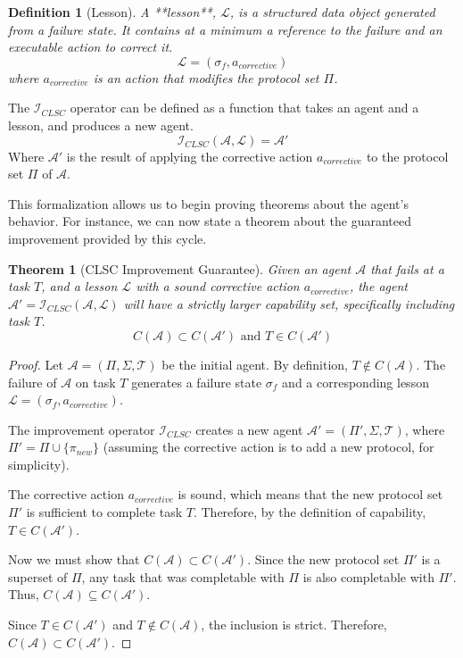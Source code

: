\documentclass{article}
\newtheorem{definition}{Definition}
\newtheorem{theorem}{Theorem}
\begin{document}
\begin{definition}[Lesson]
A **lesson**, $\mathcal{L}$, is a structured data object generated from a failure state. It contains at a minimum a reference to the failure and an executable action to correct it.
$$ \mathcal{L} = (\sigma_f, a_{corrective}) $$
where $a_{corrective}$ is an action that modifies the protocol set $\Pi$.
\end{definition}

The $\mathcal{I}_{CLSC}$ operator can be defined as a function that takes an agent and a lesson, and produces a new agent.
$$ \mathcal{I}_{CLSC}(\mathcal{A}, \mathcal{L}) = \mathcal{A}' $$
Where $\mathcal{A}'$ is the result of applying the corrective action $a_{corrective}$ to the protocol set $\Pi$ of $\mathcal{A}$.

This formalization allows us to begin proving theorems about the agent's behavior. For instance, we can now state a theorem about the guaranteed improvement provided by this cycle.

\begin{theorem}[CLSC Improvement Guarantee]
Given an agent $\mathcal{A}$ that fails at a task $T$, and a lesson $\mathcal{L}$ with a sound corrective action $a_{corrective}$, the agent $\mathcal{A}' = \mathcal{I}_{CLSC}(\mathcal{A}, \mathcal{L})$ will have a strictly larger capability set, specifically including task $T$.
$$ C(\mathcal{A}) \subset C(\mathcal{A}') \text{ and } T \in C(\mathcal{A}') $$
\end{theorem}

\begin{proof}
Let $\mathcal{A} = (\Pi, \Sigma, \mathcal{T})$ be the initial agent. By definition, $T \notin C(\mathcal{A})$. The failure of $\mathcal{A}$ on task $T$ generates a failure state $\sigma_f$ and a corresponding lesson $\mathcal{L} = (\sigma_f, a_{corrective})$.

The improvement operator $\mathcal{I}_{CLSC}$ creates a new agent $\mathcal{A}' = (\Pi', \Sigma, \mathcal{T})$, where $\Pi' = \Pi \cup \{\pi_{new}\}$ (assuming the corrective action is to add a new protocol, for simplicity).

The corrective action $a_{corrective}$ is sound, which means that the new protocol set $\Pi'$ is sufficient to complete task $T$. Therefore, by the definition of capability, $T \in C(\mathcal{A}')$.

Now we must show that $C(\mathcal{A}) \subset C(\mathcal{A}')$. Since the new protocol set $\Pi'$ is a superset of $\Pi$, any task that was completable with $\Pi$ is also completable with $\Pi'$. Thus, $C(\mathcal{A}) \subseteq C(\mathcal{A}')$.

Since $T \in C(\mathcal{A}')$ and $T \notin C(\mathcal{A})$, the inclusion is strict. Therefore, $C(\mathcal{A}) \subset C(\mathcal{A}')$.
\end{proof}
\end{document}
